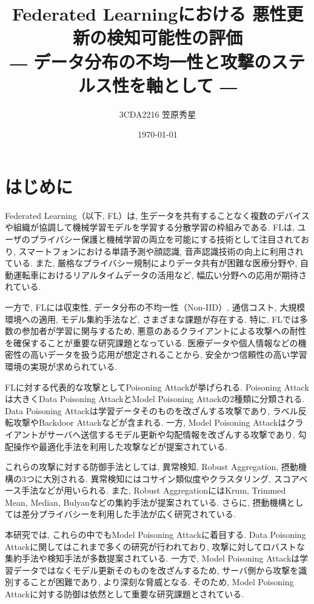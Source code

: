 \documentclass[a4j, twocolumn, dvipdfmx]{jsarticle}
\title{
Federated Learningにおける
悪性更新の検知可能性の評価\\[0.8em]
\large
― データ分布の不均一性と攻撃のステルス性を軸として ―
}
\author{3CDA2216 笠原秀星}
\date{\today}
\begin{document}
\maketitle

\section{はじめに}
\label{sec:intro}

Federated Learning（以下, FL）は, 生データを共有することなく複数のデバイスや組織が協調して機械学習モデルを学習する分散学習の枠組みである\cite{mammen2021fl}.
FLは, ユーザのプライバシー保護と機械学習の両立を可能にする技術として注目されており, スマートフォンにおける単語予測や顔認識, 音声認識技術の向上に利用されている. また, 厳格なプライバシー規制によりデータ共有が困難な医療分野や, 自動運転車におけるリアルタイムデータの活用など, 幅広い分野への応用が期待されている\cite{li2019fl}.

一方で, FLには収束性, データ分布の不均一性（Non-IID）, 通信コスト, 大規模環境への適用, モデル集約手法など, さまざまな課題が存在する\cite{ma2020privacy}. 特に, FLでは多数の参加者が学習に関与するため, 悪意のあるクライアントによる攻撃への耐性を確保することが重要な研究課題となっている. 医療データや個人情報などの機密性の高いデータを扱う応用が想定されることから, 安全かつ信頼性の高い学習環境の実現が求められている.

FLに対する代表的な攻撃としてPoisoning Attackが挙げられる. Poisoning Attackは大きくData Poisoning AttackとModel Poisoning Attackの2種類に分類される. Data Poisoning Attackは学習データそのものを改ざんする攻撃であり, ラベル反転攻撃やBackdoor Attackなどが含まれる. 一方, Model Poisoning Attackはクライアントがサーバへ送信するモデル更新や勾配情報を改ざんする攻撃であり, 勾配操作や最適化手法を利用した攻撃などが提案されている.

これらの攻撃に対する防御手法としては, 異常検知, Robust Aggregation, 摂動機構の3つに大別される. 異常検知にはコサイン類似度やクラスタリング, スコアベース手法などが用いられる. また, Robust AggregationにはKrum, Trimmed Mean, Median, Bulyanなどの集約手法が提案されている. さらに, 摂動機構としては差分プライバシーを利用した手法が広く研究されている\cite{sagar2023survey}.

本研究では, これらの中でもModel Poisoning Attackに着目する. Data Poisoning Attackに関してはこれまで多くの研究が行われており, 攻撃に対してロバストな集約手法や検知手法が多数提案されている. 一方で, Model Poisoning Attackは学習データではなくモデル更新そのものを改ざんするため, サーバ側から攻撃を識別することが困難であり, より深刻な脅威となる. そのため, Model Poisoning Attackに対する防御は依然として重要な研究課題とされている\cite{sagar2023survey}.
\end{document}
